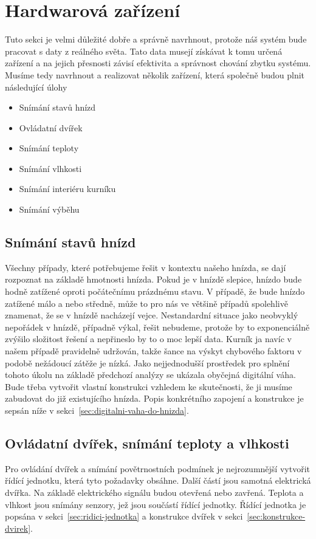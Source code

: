 \section{Hardwarová zařízení}\label{sec:hardwarova-zarizeni}
Tuto sekci je velmi důležité dobře a správně navrhnout, protože náš systém bude pracovat s daty z reálného světa.
Tato data musejí získávat k tomu určená zařízení a na jejich přesnosti závisí efektivita a správnost chování zbytku systému.
Musíme tedy navrhnout a realizovat několik zařízení, která společně budou plnit následující úlohy
\begin{itemize}
    \item Snímání stavů hnízd
    \item Ovládatní dvířek
    \item Snímání teploty
    \item Snímání vlhkosti
    \item Snímání interiéru kurníku
    \item Snímání výběhu
\end{itemize}

\subsection{Snímání stavů hnízd}
Všechny případy, které potřebujeme řešit v kontextu našeho hnízda, se dají rozpoznat na základě hmotnosti hnízda.
Pokud je v hnízdě slepice, hnízdo bude hodně zatížené oproti počátečnímu prázdnému stavu.
V případě, že bude hnízdo zatížené málo a nebo středně, může to pro nás ve většině případů spolehlivě znamenat, že se v hnízdě nacházejí vejce.
Nestandardní situace jako neobvyklý nepořádek v hnízdě, případně výkal, řešit nebudeme, protože by to exponenciálně zvýšilo složitost řešení a nepřineslo by to o moc lepší data.
Kurník ja navíc v našem případě pravidelně udržován, takže šance na výskyt chybového faktoru v podobě nežádoucí zátěže je nízká.
Jako nejjednodušší prostředek pro splnění tohoto úkolu na základě předchozí analýzy se ukázala obyčejná digitální váha.
Bude třeba vytvořit vlastní konstrukci vzhledem ke skutečnosti, že ji musíme zabudovat do již existujícího hnízda.
Popis konkrétního zapojení a konstrukce je sepsán níže v sekci~\ref{sec:digitalni-vaha-do-hnizda}.

\subsection{Ovládatní dvířek, snímání teploty a vlhkosti}
Pro ovládání dvířek a snímání povětrnostních podmínek je nejrozumnější vytvořit řídící jednotku, která tyto požadavky obsáhne.
Další částí jsou samotná elektrická dvířka. Na základě elektrického signálu budou otevřená nebo zavřená.
Teplota a vlhkost jsou snímány senzory, jež jsou součástí řídící jednotky.
Řídící jednotka je popsána v sekci~\ref{sec:ridici-jednotka} a konstrukce dvířek v sekci~\ref{sec:konstrukce-dvirek}.

